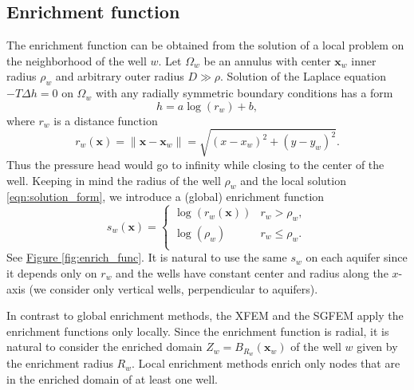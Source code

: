 \documentclass{elsarticle}
\newcommand{\fig}[1]{\hyperref[#1]{Figure \ref{#1}}}
\def\vc#1{\mathbf{\boldsymbol{#1}}}     %
\newcommand{\bx}{\vc{x}}
\newcommand{\notePE}[1]{{\color{Orange} \textbf{PE: } \textit{#1}}}
\begin{document}
\subsection{Enrichment function}
The enrichment function can be obtained from the solution of a local problem on the neighborhood of the well $w$.
Let $\Omega_w$ be an annulus with center $\vc x_w$ inner radius $\rho_w$ and arbitrary outer radius $D \gg \rho$.
Solution of the Laplace equation $-T \Delta h = 0$ on $\Omega_w$ with any radially symmetric boundary conditions has a form
%
\begin{equation} \label{eqn:solution_form}
  h = a \log(r_w)+b, %
\end{equation}
where $r_w$ is a distance function
\begin{equation} \label{eqn:distance}
r_w(\vc{x}) = \|\bx - \vc{x}_w\|= \sqrt{(x-x_w)^2+(y-y_w)^2}.
\end{equation}
%
Thus the pressure head would go to infinity while closing to the center of the well.
Keeping in mind the radius of the well $\rho_w$ and the local solution \eqref{eqn:solution_form}, 
we introduce a (global) enrichment function
%
\begin{equation}
\label{eqn:enrich_func}
s_w(\bx) = 
  \begin{cases}
  \log(r_w(\bx)) & r_w > \rho_w,\\
  \log(\rho_w) & r_w \le \rho_w.\\
  \end{cases}
\end{equation}
See \fig{fig:enrich_func}.
It is natural to use the same $s_w$ on each aquifer since it depends only on $r_w$ and the wells have constant center and radius along the $x$-axis
(we consider only vertical wells, perpendicular to aquifers).
%



In contrast to global enrichment methods, the XFEM and the SGFEM apply the enrichment functions only locally. 
Since the enrichment function is radial, it is natural to consider the enriched domain $Z_w = B_{R_w}(\vc x_w)$
of the well $w$ given by the enrichment radius $R_w$. Local enrichment methods enrich only 
nodes that are in the enriched domain of at least one well.
\end{document}
